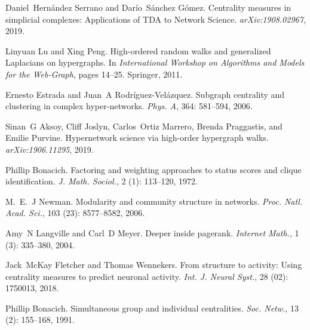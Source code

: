 Daniel~Hern{\'a}ndez Serrano and Dar{\'i}o~S{\'a}nchez G{\'o}mez.
\newblock Centrality measures in simplicial complexes: Applications of {{TDA}}
to {{Network Science}}.
\newblock \emph{arXiv:1908.02967}, 2019{}.

Linyuan Lu and Xing Peng.
\newblock High-ordered random walks and generalized {{Laplacians}} on
hypergraphs.
\newblock In \emph{International Workshop on Algorithms and Models for the
    Web-Graph}, pages 14--25. {Springer}, 2011.

Ernesto Estrada and Juan~A {Rodr{\'i}guez-Vel{\'a}zquez}.
\newblock Subgraph centrality and clustering in complex hyper-networks.
\newblock \emph{Phys. A}, 364: 581--594, 2006.

Sinan~G Aksoy, Cliff Joslyn, Carlos~Ortiz Marrero, Brenda Praggastis, and
Emilie Purvine.
\newblock Hypernetwork science via high-order hypergraph walks.
\newblock \emph{arXiv:1906.11295}, 2019.

Phillip Bonacich.
\newblock Factoring and weighting approaches to status scores and clique
identification.
\newblock \emph{J. Math. Sociol.}, 2 (1): 113--120, 1972.

M.~E.~J Newman.
\newblock Modularity and community structure in networks.
\newblock \emph{Proc. Natl. Acad. Sci.}, 103 (23):
8577--8582, 2006.

Amy~N Langville and Carl~D Meyer.
\newblock Deeper inside pagerank.
\newblock \emph{Internet Math.}, 1 (3): 335--380, 2004.

Jack~McKay Fletcher and Thomas Wennekers.
\newblock From structure to activity: Using centrality measures to predict
neuronal activity.
\newblock \emph{Int. J. Neural Syst.}, 28 (02): 1750013,
2018.

Phillip Bonacich.
\newblock Simultaneous group and individual centralities.
\newblock \emph{Soc. Netw.}, 13 (2): 155--168, 1991.

